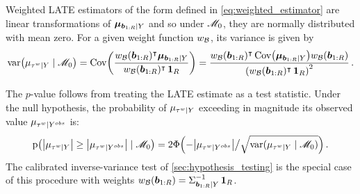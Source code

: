Weighted LATE estimators of the form defined in \autoref{eq:weighted_estimator} are linear transformations of \(\bm{\mu}_{\bm{b}_{1:R} \mid Y}\) and so under \(\mathscr{M}_0\), they are normally distributed with mean zero.
For a given weight function \(w_{\mathcal{B}}\), its variance is given by
\begin{equation}
        \var\del{\mu_{\tauw \mid Y} \mid \modnull} = \cov\del{ \frac{\weightb(\sentinels)\trans \muvec_{\sentinels \mid Y}}{ \weightb(\sentinels)\trans\ones_{\numsent}}}
        = \frac{\weightb(\sentinels) \trans \cov \del{\muvec_{\sentinels \mid Y}} \weightb(\sentinels)}{\del{ \weightb(\sentinels)\trans\ones_{\numsent}}^2}
        \,.
\end{equation}

The \(p\)-value follows from treating the LATE estimate as a test statistic.
Under the null hypothesis, the probability of \(\mu_{\tau^{w} \mid Y}\) exceeding in magnitude its observed value \(\mu_{\tau^{w} \mid Y^{obs}}\) is:
\begin{equation}
    \prob\del{ \abs{\mu_{\tauw \mid Y}} \ge \abs{\mu_{\tauw \mid Y^{obs}}} \mid \modnull} = 2 \Phi\del{ -\abs{\mu_{\tauw \mid Y^{obs}}} \big/ {\sqrt{\var({\mu_{\tauw \mid Y} \mid \modnull})}} }\,.
\end{equation}
The calibrated inverse-variance test of \autoref{sec:hypothesis_testing} is the special case of this procedure with weights \(w_{\mathcal{B}}(\bm{b}_{1:R}) = \Sigma^{-1}_{\bm{b}_{1:R} \mid Y} \operatorname{\mathbf{1}}_{R}\).
